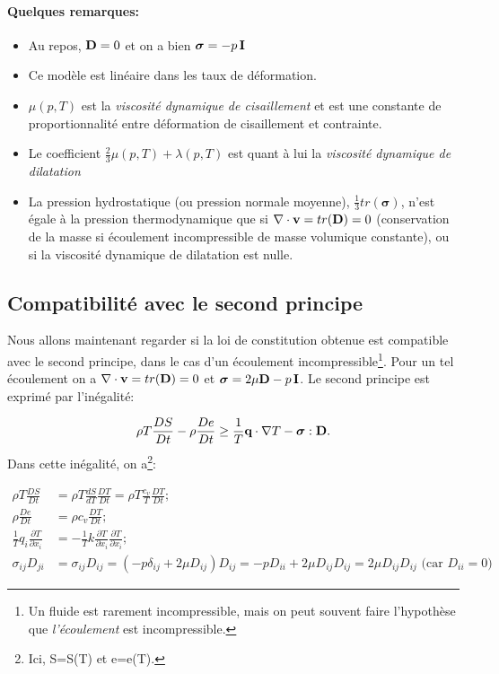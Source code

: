 \paragraph{Quelques remarques:}
\begin{itemize}
\item Au repos, $\textbf{D}=0$ et on a bien $\boldsymbol{\sigma}=-p\,\textbf{I}$
\item Ce modèle est linéaire dans les taux de déformation.
\item $\mu(p,T)$ est la \emph{viscosité dynamique de cisaillement} et est une constante de proportionnalité entre  déformation de cisaillement et contrainte.
\item Le coefficient $\frac{2}{3}\mu(p,T)+\lambda(p,T)$ est quant à lui la \emph{viscosité dynamique de dilatation}
\item La pression hydrostatique (ou pression normale moyenne), $\frac{1}{3}tr(\boldsymbol{\sigma})$, n'est égale à la pression thermodynamique que si $\nabla\cdot\textbf{v}=tr(\textbf{D})=0$ (conservation de la masse si écoulement incompressible de masse volumique constante), ou si la viscosité dynamique de dilatation est nulle.

\end{itemize}

\subsection{Compatibilité avec le second principe}
Nous allons maintenant regarder si la loi de constitution obtenue est compatible avec le second principe, dans le cas d'un écoulement incompressible\footnote{Un fluide est rarement incompressible, mais on peut souvent faire l'hypothèse que \emph{l'écoulement} est incompressible.}. Pour un tel écoulement on a $\nabla\cdot\textbf{v}=tr(\textbf{D})=0$ et $\boldsymbol{\sigma}=2\mu\textbf{D}-p\,\textbf{I}$. Le second principe est exprimé par l'inégalité:

$$\rho T\frac{DS}{Dt}-\rho\frac{De}{Dt}\geq\frac{1}{T}\textbf{q}\cdot\nabla T-\boldsymbol{\sigma}:\textbf{D}.$$ Dans cette inégalité,
on a\footnote{Ici, S=S(T) et e=e(T).}:

\begin{align*}
\rho T\frac{DS}{Dt}&=\rho T\frac{dS}{dT}\frac{DT}{Dt}=\rho T\frac{c_v}{T}\frac{DT}{Dt};\\
\rho\frac{De}{Dt}&=\rho c_v\frac{DT}{Dt};\\
\frac{1}{T}q_i\frac{\partial T}{\partial x_i}&=-\frac{1}{T}k\frac{\partial T}{\partial x_i}\frac{\partial T}{\partial x_i};\\
\sigma_{ij}D_{ji}&=\sigma_{ij}D_{ij}=(-p\delta_{ij}+2\mu D_{ij})D_{ij}=-pD_{ii}+2\mu D_{ij}D_{ij}= 2\mu D_{ij}D_{ij} \text{ (car $D_{ii}=0$)}
\end{align*}

